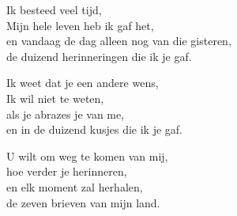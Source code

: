 \clearpage
\begin{translation}
Ik besteed veel tijd,\\
Mijn hele leven heb ik gaf het,\\
en vandaag de dag alleen nog van die gisteren,\\
de duizend herinneringen die ik je gaf.\vspace{\wlskip}

Ik weet dat je een andere wens,\\
Ik wil niet te weten,\\
als je abrazes je van me,\\
en in de duizend kusjes die ik je gaf.\vspace{\wlskip}

U wilt om weg te komen van mij,\\
hoe verder je herinneren,\\
en elk moment zal herhalen,\\
de zeven brieven van mijn land.
\end{translation}
